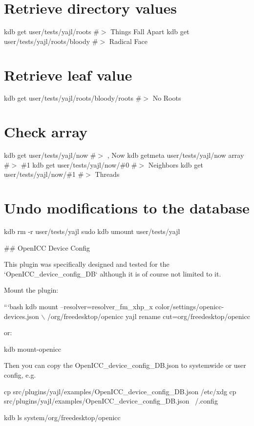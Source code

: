 \section*{Retrieve directory values}

kdb get user/tests/yajl/roots \#$>$ Things Fall Apart kdb get user/tests/yajl/roots/bloody \#$>$ Radical Face

\section*{Retrieve leaf value}

kdb get user/tests/yajl/roots/bloody/roots \#$>$ No Roots

\section*{Check array}

kdb get user/tests/yajl/now \#$>$ , Now kdb getmeta user/tests/yajl/now array \#$>$ \#1 kdb get user/tests/yajl/now/\#0 \#$>$ Neighbors kdb get user/tests/yajl/now/\#1 \#$>$ Threads

\section*{Undo modifications to the database}

kdb rm -\/r user/tests/yajl sudo kdb umount user/tests/yajl 
\begin{DoxyCode}
## OpenICC Device Config

This plugin was specifically designed and tested for the
`OpenICC\_device\_config\_DB` although it is of course not limited
to it.

Mount the plugin:

```bash
kdb mount --resolver=resolver\_fm\_xhp\_x color/settings/openicc-devices.json \(\backslash\)
  /org/freedesktop/openicc yajl rename cut=org/freedesktop/openicc
\end{DoxyCode}


or\+:


\begin{DoxyCode}
kdb mount-openicc
\end{DoxyCode}


Then you can copy the {\ttfamily Open\+I\+C\+C\+\_\+device\+\_\+config\+\_\+\+D\+B.\+json} to systemwide or user config, e.\+g.


\begin{DoxyCode}
cp src/plugins/yajl/examples/OpenICC\_device\_config\_DB.json /etc/xdg
cp src/plugins/yajl/examples/OpenICC\_device\_config\_DB.json ~/.config

kdb ls system/org/freedesktop/openicc
\end{DoxyCode}


